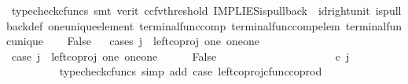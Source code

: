 \begin{isabellebody}
\ {\isacharparenleft}{\kern0pt}typecheck{\isacharunderscore}{\kern0pt}cfuncs{\isacharcomma}{\kern0pt}\ smt\ {\isacharparenleft}{\kern0pt}verit{\isacharcomma}{\kern0pt}\ ccfv{\isacharunderscore}{\kern0pt}threshold{\isacharparenright}{\kern0pt}\ IMPLIES{\isacharunderscore}{\kern0pt}is{\isacharunderscore}{\kern0pt}pullback\ \ id{\isacharunderscore}{\kern0pt}right{\isacharunderscore}{\kern0pt}unit{}\ is{\isacharunderscore}{\kern0pt}pullback{\isacharunderscore}{\kern0pt}def\ one{\isacharunderscore}{\kern0pt}unique{\isacharunderscore}{\kern0pt}element\ terminal{\isacharunderscore}{\kern0pt}func{\isacharunderscore}{\kern0pt}comp\ terminal{\isacharunderscore}{\kern0pt}func{\isacharunderscore}{\kern0pt}comp{\isacharunderscore}{\kern0pt}elem\ terminal{\isacharunderscore}{\kern0pt}func{\isacharunderscore}{\kern0pt}unique{\isacharparenright}{\kern0pt}\isanewline
\ \ \isamarkupfalse%
\ False\isanewline
\ \ \isamarkupfalse%
{\isacharparenleft}{\kern0pt}cases\ {\isachardoublequoteopen}j\ {\isacharequal}{\kern0pt}\ left{\isacharunderscore}{\kern0pt}coproj\ one\ {\isacharparenleft}{\kern0pt}one{\isasymCoprod}one{\isacharparenright}{\kern0pt}{\isachardoublequoteclose}{\isacharparenright}{\kern0pt}\isanewline
\ \ \ \ \isamarkupfalse%
\ case{}{\isacharcolon}{\kern0pt}\ {\isachardoublequoteopen}j\ {\isacharequal}{\kern0pt}\ left{\isacharunderscore}{\kern0pt}coproj\ one\ {\isacharparenleft}{\kern0pt}one{\isasymCoprod}one{\isacharparenright}{\kern0pt}{\isachardoublequoteclose}\isanewline
\ \ \ \ \isamarkupfalse%
\ False\isanewline
\ \ \ \ \isamarkupfalse%
\ {\isacharminus}{\kern0pt}\ \isanewline
\ \ \ \ \ \ \isamarkupfalse%
\ {\isachardoublequoteopen}{\isacharparenleft}{\kern0pt}{\isasymlangle}{\isasymt}{\isacharcomma}{\kern0pt}\ {\isasymt}{\isasymrangle}{\isasymamalg}\ {\isacharparenleft}{\kern0pt}{\isasymlangle}{\isasymf}{\isacharcomma}{\kern0pt}\ {\isasymf}{\isasymrangle}\ {\isasymamalg}{\isasymlangle}{\isasymf}{\isacharcomma}{\kern0pt}\ {\isasymt}{\isasymrangle}{\isacharparenright}{\kern0pt}{\isacharparenright}{\kern0pt}\ {\isasymcirc}\isactrlsub c\ j\ {\isacharequal}{\kern0pt}\ {\isasymlangle}{\isasymt}{\isacharcomma}{\kern0pt}\ {\isasymt}{\isasymrangle}{\isachardoublequoteclose}\isanewline
\ \ \ \ \ \ \ \ \isamarkupfalse%
\ {\isacharparenleft}{\kern0pt}typecheck{\isacharunderscore}{\kern0pt}cfuncs{\isacharcomma}{\kern0pt}\ simp\ add{\isacharcolon}{\kern0pt}\ case{}\ left{\isacharunderscore}{\kern0pt}coproj{\isacharunderscore}{\kern0pt}cfunc{\isacharunderscore}{\kern0pt}coprod{\isacharparenright}{\kern0pt}\isanewline

\end{isabellebody}
